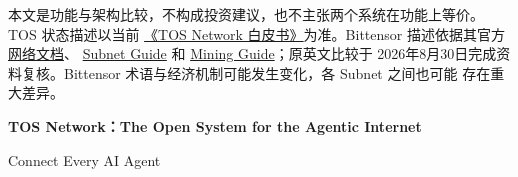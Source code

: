 \documentclass[UTF8,11pt,fontset=fandol]{ctexart}
\begin{document}
本文是功能与架构比较，不构成投资建议，也不主张两个系统在功能上等价。TOS 状态描述以当前
\href{tos.pdf}{《TOS Network 白皮书》}为准。Bittensor 描述依据其官方
\href{https://www.bittensor.com/docs}{网络文档}、
\href{https://www.bittensor.com/docs/guides/subnets}{Subnet Guide} 和
\href{https://www.bittensor.com/docs/guides/mining}{Mining Guide}；原英文比较于
2026年8月30日完成资料复核。Bittensor 术语与经济机制可能发生变化，各 Subnet 之间也可能
存在重大差异。

\vfill
\begin{center}
\small
\textbf{TOS Network：The Open System for the Agentic Internet}\par
Connect Every AI Agent
\end{center}
\end{document}
